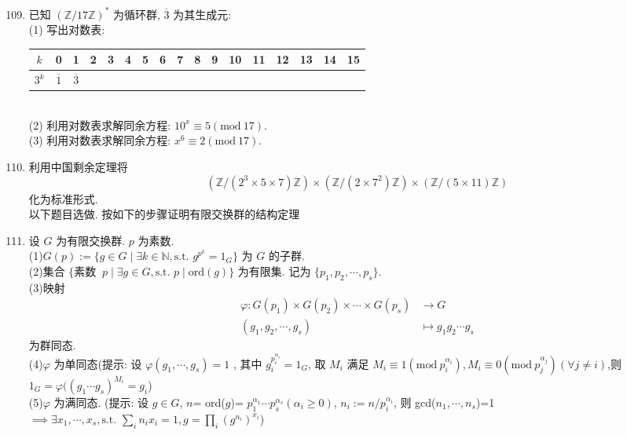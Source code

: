 \documentclass[a4paper,12pt]{article}
\begin{document}
\begin{enumerate}\setcounter{enumi}{108}

    \item 已知 $(\mathbb{Z}/17\mathbb{Z})^*$ 为循环群, $\overline{3}$ 为其生成元: \\
    (1) 写出对数表:\\
    \begin{tabular}{|c|c|c|c|c|c|c|c|c|c|c|c|c|c|c|c|c|}
    \hline
    $k$ & 0 & 1 & 2 & 3 & 4 & 5 & 6 & 7 & 8 & 9 & 10 & 11 & 12 & 13 & 14 & 15\\ \hline
    $3^k$ & $\overline{1}$ & $\overline{3}$ & & & & & & & & & & & & & & \\ \hline
    \end{tabular}\\
    (2) 利用对数表求解同余方程: $10^x\equiv5(\text{mod}\ 17)$.\\
    (3) 利用对数表求解同余方程: $x^6\equiv2(\text{mod}\ 17)$.

    \item 利用中国剩余定理将 $$(\mathbb{Z}/(2^3\times 5\times 7)\mathbb{Z})\times (\mathbb{Z}/(2\times 7^2)\mathbb{Z})\times (\mathbb{Z}/(5\times 11)\mathbb{Z})$$ 化为标准形式.  \\

    {\color{red} 以下题目选做. 按如下的步骤证明有限交换群的结构定理}

    \item 设 $G$ 为有限交换群. $p$ 为素数.\\
    (1)\quad $G(p):=\{g\in G\mid \exists k\in\mathbb{N},\text{s.t. } g^{p^k}=1_{G}\}$ 为 $G$ 的子群.\\
    (2)\quad 集合 $\{\text{素数  }\ p\mid \exists g\in G,\text{s.t. }p\mid \text{ord}(g)\}$ 为有限集. 记为 $\{p_1,p_2,\cdots,p_s\}$. \\
    (3)\quad 映射 
    \begin{align*}
    \varphi: G(p_1)\times G(p_2)\times \cdots\times G(p_s)&\longrightarrow G\\
    (g_1,g_2,\cdots,g_s)&\longmapsto g_1g_2\cdots g_s
    \end{align*}
    为群同态.\\
    (4)\quad $\varphi$ 为单同态{(提示: 设 $\varphi(g_1,\cdots,g_s)=1$ , 其中 $g_i^{p_i^{\alpha_i}}=1_G$, 取 $M_i$ 满足 $M_i\equiv 1(\text{mod}\ p_i^{\alpha_i}),M_i\equiv0 (\text{mod}\  p_j^{\alpha_j})(\forall j\not=i)$,则 $1_G=\varphi((g_1\cdots g_s)^{M_i}=g_i$)}\\
    (5)\quad $\varphi$ 为满同态. (提示: 设 $g\in G$, $n$= ord($g$)= $p_1^{\alpha_1}\cdots p_s^{\alpha_s}(\alpha_i \geq 0)$, $n_i:=n/p_i^{\alpha_i}$, 则 gcd($n_1,\cdots,n_s$)=1$\implies\exists x_1,\cdots,x_s,\text{s.t. } \sum_{i} n_ix_i=1,g=\prod_i (g^{n_i})^{x_i}$)


\end{enumerate}
\end{document}
